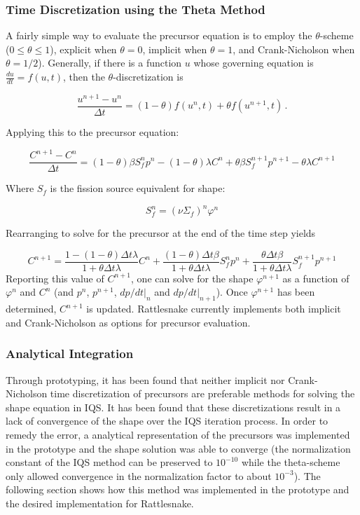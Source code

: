 \documentclass[10pt]{scrartcl}
\newcommand{\be}{\begin{equation}}
\newcommand{\ee}{\end{equation}}
\begin{document}
\subsubsection{Time Discretization using the Theta Method}

A fairly simple way to evaluate the precursor equation is to employ the $\theta$-scheme ($0\le\theta\le1$),
explicit when $\theta=0$, implicit when $\theta=1$, and Crank-Nicholson when $\theta=1/2$).
Generally, if there is a function $u$ whose governing equation is $\frac{du}{dt}=f(u,t)$,
then the $\theta$-discretization is

\be
\frac{u^{n+1}-u^n}{\Delta t}=(1-\theta)f(u^n,t) + \theta f(u^{n+1},t) \,.
\ee

Applying this to the precursor equation:

\be
\frac{C^{n+1}-C^n}{\Delta t}=(1-\theta)\beta S_f^np^n-(1-\theta)\lambda C^n + \theta\beta S_f^{n+1}p^{n+1}-\theta\lambda C^{n+1}
\ee

Where $S_f$ is the fission source equivalent for shape:

\be
S_f^n=(\nu\Sigma_f)^n\varphi^n
\ee

Rearranging to solve for the precursor at the end of the time step yields

\be
C^{n+1} = \frac{1-(1-\theta)\Delta t\lambda}{1+\theta\Delta t\lambda}C^n + \frac{(1-\theta)\Delta t \beta}{1+\theta\Delta t\lambda}S_f^n p^n +  \frac{\theta\Delta t \beta}{1+\theta\Delta t\lambda}S_f^{n+1} p^{n+1}
\ee
Reporting this value of $C^{n+1}$, one can solve for the shape $\varphi^{n+1}$ as a function of $\varphi^n$ and $C^n$
(and $p^n$, $p^{n+1}$, $dp/dt|_n$ and  $dp/dt|_{n+1}$).
Once $\varphi^{n+1}$ has been determined, $C^{n+1}$ is updated. Rattlesnake currently implements both implicit and Crank-Nicholson as options for precursor evaluation.


\subsubsection{Analytical Integration}

Through prototyping, it has been found that neither implicit nor Crank-Nicholson time discretization of precursors are preferable methods for solving the shape equation in IQS.  It has been found that these discretizations result in a lack of convergence of the shape over the IQS iteration process.  In order to remedy the error, a analytical representation of the precursors was implemented in the prototype and the shape solution was able to converge (the normalization constant of the IQS method can be preserved to $10^{-10}$ while the theta-scheme only allowed convergence in the normalization factor to about $10^{-3}$).  The following section shows how this method was implemented in the prototype and the desired implementation for Rattlesnake.
\end{document}
